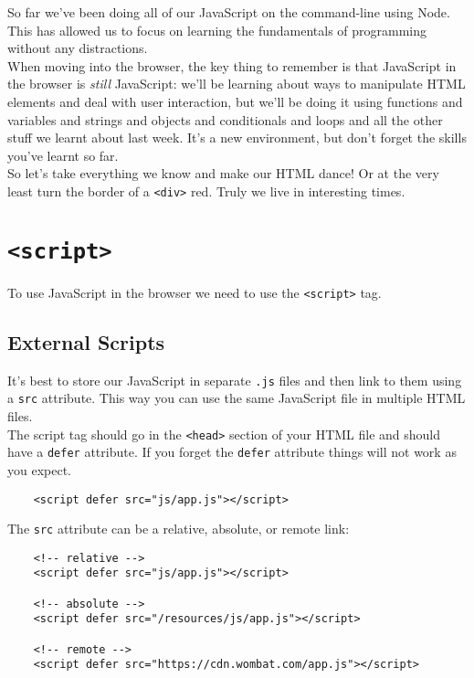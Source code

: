 So far we've been doing all of our JavaScript on the command-line using Node. This has allowed us to focus on learning the fundamentals of programming without any distractions.
\\

When moving into the browser, the key thing to remember is that JavaScript in the browser is \textit{still} JavaScript: we'll be learning about ways to manipulate HTML elements and deal with user interaction, but we'll be doing it using functions and variables and strings and objects and conditionals and loops and all the other stuff we learnt about last week. It's a new environment, but don't forget the skills you've learnt so far.
\\

So let's take everything we know and make our HTML dance! Or at the very least turn the border of a \texttt{<div>} red. Truly we live in interesting times.

\pagebreak


\section{\texttt{<script>}}

To use JavaScript in the browser we need to use the \texttt{<script>} tag.

\subsection{External Scripts}

It's best to store our JavaScript in separate \texttt{.js} files and then link to them using a \texttt{src} attribute. This way you can use the same JavaScript file in multiple HTML files.
\\

The script tag should go in the \texttt{<head>} section of your HTML file and should have a \texttt{defer} attribute. If you forget the \texttt{defer} attribute things will not work as you expect.

\begin{verbatim}
    <script defer src="js/app.js"></script>
\end{verbatim}

The \texttt{src} attribute can be a relative, absolute, or remote link:

\begin{verbatim}
    <!-- relative -->
    <script defer src="js/app.js"></script>

    <!-- absolute -->
    <script defer src="/resources/js/app.js"></script>

    <!-- remote -->
    <script defer src="https://cdn.wombat.com/app.js"></script>
\end{verbatim}

